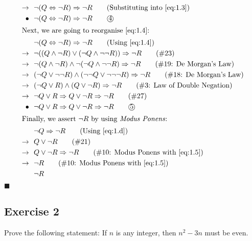 \documentclass[12pt]{article}
\begin{document}
\begin{align*}
    \rightarrow\ \ & \neg (Q \Leftrightarrow \neg R) \Rightarrow \neg R   \tag{Substituting into\ \ref{eq:1.3}} \\
    \bullet\ \ & \neg (Q \Leftrightarrow \neg R) \Rightarrow \neg R       \tag*{\textcircled{4}} \label{eq:1.4} \\
  \intertext{Next, we are going to reorganise\ \ref{eq:1.4}:}
    & \neg (Q \Leftrightarrow \neg R) \Rightarrow \neg R                                            \tag{Using\ \ref{eq:1.4}} \\
    \rightarrow\ \ & \neg ((Q \land \neg R) \lor (\neg Q \land \neg \neg R)) \Rightarrow \neg R     \tag{\#23} \\
    \rightarrow\ \ & \neg (Q \land \neg R) \land \neg (\neg Q \land \neg \neg R) \Rightarrow \neg R \tag{\#19: De Morgan's Law} \\
    \rightarrow\ \ & (\neg Q \lor \neg \neg R) \land (\neg \neg Q \lor \neg \neg \neg R) \Rightarrow \neg R \tag{\#18: De Morgan's Law} \\
    \rightarrow\ \ & (\neg Q \lor R) \land (Q \lor \neg R) \Rightarrow \neg R                       \tag{\#3: Law of Double Negation} \\
    \rightarrow\ \ & \neg Q \lor R \Rightarrow Q \lor \neg R \Rightarrow \neg R                     \tag{\#27} \\
    \bullet\ \ & \neg Q \lor R \Rightarrow Q \lor \neg R \Rightarrow \neg R                         \tag*{\textcircled{5}} \label{eq:1.5} \\
  \intertext{Finally, we assert $\neg R$ by using \textit{Modus Ponens}:}
    & \neg Q \Rightarrow \neg R                                         \tag{Using\ \ref{eq:1.d}} \\
    \rightarrow\ \ & Q \lor \neg R                                      \tag{\#21} \\
    \rightarrow\ \ & Q \lor \neg R \Rightarrow \neg R                   \tag{\#10: Modus Ponens with\ \ref{eq:1.5}} \\
    \rightarrow\ \ & \neg R                                             \tag{\#10: Modus Ponens with\ \ref{eq:1.5}} \\
    & \neg R
\end{align*}
\null\hfill $\blacksquare$
\pagebreak

\subsection*{Exercise 2}

Prove the following statement: If $n$ is any integer, then $n^{2}-3n$ must be even.
\end{document}
